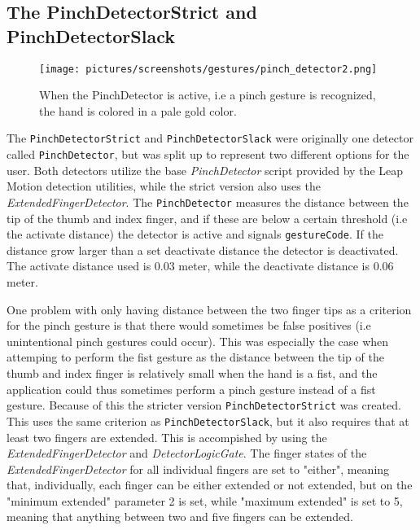 \subsection{The PinchDetectorStrict and PinchDetectorSlack}
\begin{figure}%
	\texttt{[image: pictures/screenshots/gestures/pinch\_detector2.png]}
	\caption[The pinch gesture]{When the PinchDetector is active, i.e a pinch gesture is recognized, the hand is colored in a pale gold color.}
	\label{fig:pinch_detector2}
\end{figure} 

The \texttt{PinchDetectorStrict} and \texttt{PinchDetectorSlack} were originally one detector called \texttt{PinchDetector}, but was split up to represent two 
different options for the user. Both detectors utilize the base \textit{PinchDetector} script provided by the Leap Motion detection utilities, while the strict version
also uses the \textit{ExtendedFingerDetector}. The \texttt{PinchDetector} measures the distance between the tip of the thumb and index finger, and if these are below
a certain threshold (i.e the activate distance) the detector is active and signals \texttt{gestureCode}. If the distance grow larger than a set deactivate distance
the detector is deactivated. The activate distance used is 0.03 meter, while the deactivate distance is 0.06 meter. 

One problem with only having distance between the two finger tips as a criterion for the pinch gesture is that there would sometimes be false positives 
(i.e unintentional pinch gestures could occur). This was especially the case when attemping to perform the fist gesture as the distance between the tip of the
thumb and index finger is relatively small when the hand is a fist, and the application could thus sometimes perform a pinch gesture instead of a fist gesture.
Because of this the stricter version \texttt{PinchDetectorStrict} was created. This uses the same criterion as \texttt{PinchDetectorSlack}, but it also requires
that at least two fingers are extended. This is accompished by using the \textit{ExtendedFingerDetector} and \textit{DetectorLogicGate}. 
The finger states of the \textit{ExtendedFingerDetector} for all individual fingers are set to "either", meaning that, individually, each finger can 
be either extended or not extended, but on the "minimum extended" parameter 2 is set, while "maximum extended" is set to 5, 
meaning that anything between two and five fingers can be extended. 

